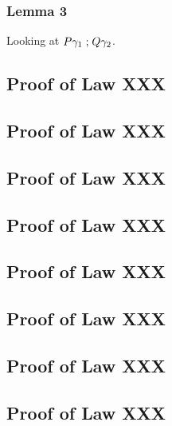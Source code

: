 \subsubsection{Lemma 3}

Looking at $P\gamma_1 \mathrel{;} Q\gamma_2$.




\newpage
\subsection{Proof of Law XXX}

\subsection{Proof of Law XXX}

\subsection{Proof of Law XXX}

\subsection{Proof of Law XXX}

\subsection{Proof of Law XXX}

\subsection{Proof of Law XXX}

\subsection{Proof of Law XXX}

\subsection{Proof of Law XXX}

